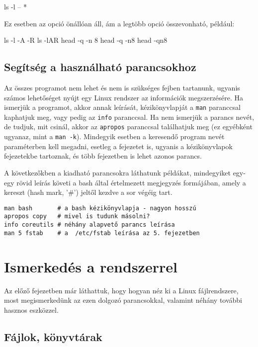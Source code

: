 \begin{VerbExample}
 ls -l -- *
\end{VerbExample}

Ez esetben az opció önállóan áll, ám a legtöbb opció összevonható, például:

\begin{VerbExample}
ls -l -A -R
ls -lAR
head -q -n 8
head -q -n8
head -qn8
\end{VerbExample} 

\subsection{Segítség a használható parancsokhoz}

Az összes programot nem lehet és nem is szükséges fejben tartanunk, ugyanis
számos lehetőséget nyújt egy Linux rendszer az információk megszerzésére. Ha
ismerjük a programot, akkor annak leírását, kézikönyvlapját a \texttt{man}
paranccsal kaphatjuk meg, vagy pedig az \texttt{info} paranccsal. Ha nem
ismerjük a parancs nevét, de tudjuk, mit csinál, akkor az \texttt{apropos}
paranccsal találhatjuk meg (ez egyébként ugyanaz, mint a \texttt{man
  -k}). Mindegyik esetben a keresendő program nevét paraméterben kell megadni,
esetleg a fejezetet is, ugyanis a kézikönyvlapok fejezetekbe tartoznak, és több
fejezetben is lehet azonos parancs.

A következőkben a kiadható parancsokra láthatunk példákat, mindegyiket egy-egy
rövid leírás követi a bash által értelmezett megjegyzés formájában, amely a
kereszt (hash mark, '\#') jeltől kezdve a sor végéig tart.

\begin{Verbatim}[xleftmargin=10mm]
man bash       # a bash kézikönyvlapja - nagyon hosszú
apropos copy   # mivel is tudunk másolni?
info coreutils # néhány alapvető parancs leírása
man 5 fstab    # a  /etc/fstab leírása az 5. fejezetben
\end{Verbatim}



\section{Ismerkedés a rendszerrel}

Az előző fejezetben már láthattuk, hogy hogyan néz ki a Linux fájlrendszere,
most megismerkedünk az ezen dolgozó parancsokkal, valamint néhány további
hasznos eszközzel.

\subsection{Fájlok, könyvtárak}


